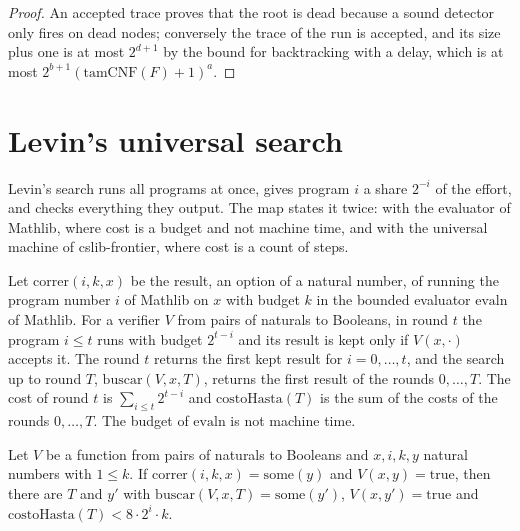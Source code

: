 \begin{proof}
  \leanok
  An accepted trace proves that the root is dead because a sound detector only fires on dead
  nodes; conversely the trace of the run is accepted, and its size plus one is at most $2^{d+1}$
  by the bound for backtracking with a delay, which is at most $2^{b+1}(\mathrm{tamCNF}(F)+1)^a$.
\end{proof}

\section{Levin's universal search}
\label{sec:search-levin}

Levin's search runs all programs at once, gives program $i$ a share $2^{-i}$ of the effort, and
checks everything they output. The map states it twice: with the evaluator of Mathlib, where cost
is a budget and not machine time, and with the universal machine of cslib-frontier, where cost is
a count of steps.

\begin{definition}
  \label{def:search-levin-evaln}
  \leanok
  Let $\mathrm{correr}(i, k, x)$ be the result, an option of a natural number, of running the
  program number $i$ of Mathlib on $x$ with budget $k$ in the bounded evaluator
  $\mathrm{evaln}$ of Mathlib. For a verifier $V$ from pairs of naturals to Booleans, in round $t$
  the program $i \le t$ runs with budget $2^{t-i}$ and its result is kept only if $V(x, \cdot)$ accepts
  it. The round $t$ returns the first kept result for $i = 0, \dots, t$, and the search up to round
  $T$, $\mathrm{buscar}(V, x, T)$, returns the first result of the rounds $0, \dots, T$. The cost of
  round $t$ is $\sum_{i \le t} 2^{t-i}$ and $\mathrm{costoHasta}(T)$ is the sum of the costs of the
  rounds $0, \dots, T$. The budget of $\mathrm{evaln}$ is not machine time.
  \own{}
\end{definition}

\begin{theorem}
  \label{thm:search-levin}
  \leanok
  Let $V$ be a function from pairs of naturals to Booleans and $x, i, k, y$ natural numbers with
  $1 \le k$. If $\mathrm{correr}(i, k, x) = \mathrm{some}(y)$ and $V(x, y) = \mathrm{true}$, then there
  are $T$ and $y'$ with $\mathrm{buscar}(V, x, T) = \mathrm{some}(y')$, $V(x, y') = \mathrm{true}$ and
  $\mathrm{costoHasta}(T) < 8 \cdot 2^i \cdot k$.
\end{theorem}

